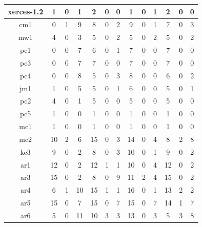 \begin{table}[!t]
\begin{tabular}{|c||c|c|c||c|c|c||c|c|c||c|c|c|}
    xerces-1.2  &1      &0      &1      &2      &0      &0      &1      &0      &1      &2      &0      &0\\ \hline
    cm1 &0      &1      &9      &8      &0      &2      &9      &0      &1      &7      &0      &3\\ \hline
    mw1 &4      &0      &3      &5      &0      &2      &5      &0      &2      &5      &0      &2\\ \hline
    pc1 &0      &0      &7      &6      &0      &1      &7      &0      &0      &7      &0      &0\\ \hline
    pc3 &0      &0      &7      &7      &0      &0      &7      &0      &0      &7      &0      &0\\ \hline
    pc4 &0      &0      &8      &5      &0      &3      &8      &0      &0      &6      &0      &2\\ \hline
    jm1 &1      &0      &5      &5      &0      &1      &6      &0      &0      &5      &0      &1\\ \hline
    pc2 &4      &0      &1      &5      &0      &0      &5      &0      &0      &5      &0      &0\\ \hline
    pc5 &1      &0      &0      &1      &0      &0      &1      &0      &0      &1      &0      &0\\ \hline
    mc1 &1      &0      &0      &1      &0      &0      &1      &0      &0      &1      &0      &0\\ \hline
    mc2 &10     &2      &6      &15     &0      &3      &14     &0      &4      &8      &2      &8\\ \hline
    kc3 &9      &0      &2      &8      &0      &3      &10     &0      &1      &9      &0      &2\\ \hline
    ar1 &12     &0      &2      &12     &1      &1      &10     &0      &4      &12     &0      &2\\ \hline
    ar3 &15     &0      &2      &8      &0      &9      &11     &2      &4      &15     &0      &2\\ \hline
    ar4 &6      &1      &10     &15     &1      &1      &16     &0      &1      &13     &2      &2\\ \hline
    ar5 &15     &0      &7      &15     &0      &7      &15     &0      &7      &14     &1      &7\\ \hline
    ar6 &5      &0      &11     &10     &3      &3      &13     &0      &3      &5      &3      &8\\ \hline

\end{tabular}
\end{table}
